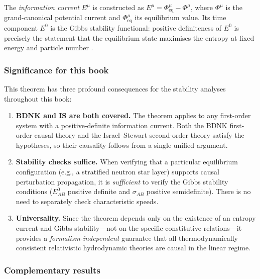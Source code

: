 \noindent
The \emph{information current} $E^{\mu}$ is constructed as
$E^{\mu} = \Phi_{\mathrm{eq}}^{\mu} - \Phi^{\mu}$, where
$\Phi^{\mu}$ is the grand-canonical potential current and
$\Phi_{\mathrm{eq}}^{\mu}$ its equilibrium value.  Its time component
$E^{0}$ is the Gibbs stability functional: positive definiteness of
$E^{0}$ is precisely the statement that the equilibrium state maximises
the entropy at fixed energy and particle number
\citep{GavassinoGibbs2021}.

\subsubsection{Significance for this book}
This theorem has three profound consequences for the stability
analyses throughout this book:

\begin{enumerate}
  \item \textbf{BDNK and IS are both covered.}  The theorem applies to
    any first-order system with a positive-definite information current.
    Both the BDNK first-order causal theory
    \citep{BemficaDN2018,Kovtun2019} and the Israel--Stewart
    second-order theory \citep{IsraelStewart1979} satisfy the
    hypotheses, so their causality follows from a single unified
    argument.

  \item \textbf{Stability checks suffice.}  When verifying that a
    particular equilibrium configuration (e.g., a stratified neutron
    star layer) supports causal perturbation propagation, it is
    \emph{sufficient} to verify the Gibbs stability conditions
    ($E^{0}_{AB}$ positive definite and $\sigma_{AB}$ positive
    semidefinite).  There is no need to separately check characteristic
    speeds.

  \item \textbf{Universality.}  Since the theorem depends only on the
    existence of an entropy current and Gibbs stability---not on the
    specific constitutive relations---it provides a
    \emph{formalism-independent} guarantee that all thermodynamically
    consistent relativistic hydrodynamic theories are causal in the
    linear regime.
\end{enumerate}

\subsubsection{Complementary results}

